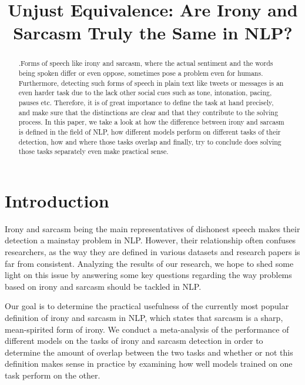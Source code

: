 \documentclass[10pt, a4paper]{article}
\title{Unjust Equivalence: Are Irony and Sarcasm Truly the Same in NLP?}
\begin{document}
\maketitleabstract

\begin{abstract}
   .Forms of speech like irony and sarcasm, where the actual sentiment and the words being spoken differ or even 
   oppose, sometimes pose a problem even for humans. Furthermore, detecting such forms of speech in plain text
   like tweets or messages is an even harder task due to the lack other social cues such as tone, intonation, pacing,
   pauses etc. Therefore, it is of great importance to define the task at hand precisely, and make sure that the
   distinctions are clear and that they contribute to the solving process. 
   In this paper, we take a look at how the difference between irony and sarcasm is defined in the field of NLP,
   how different models perform on different tasks of their detection, how and where those tasks overlap and finally,
   try to conclude does solving those tasks separately even make practical sense.  
      
\end{abstract}


\section{Introduction}

Irony and sarcasm being the main representatives of dishonest speech makes their detection a mainstay problem in NLP. However,
their relationship often confuses researchers, as the way they are defined in various datasets and research papers is far from
consistent. Analyzing the results of our research, we hope to shed some light on this issue by answering some key questions regarding
the way problems based on irony and sarcasm should be tackled in NLP.

Our goal is to determine the practical usefulness of the currently most popular definition of irony and sarcasm in NLP, which
states that sarcasm is a sharp, mean-spirited form of irony. We conduct a meta-analysis of the performance of different
models on the tasks of irony and sarcasm detection in order to determine the amount of overlap between the two tasks and
whether or not this definition makes sense in practice by examining how well models trained on one task perform on the other.
\end{document}
